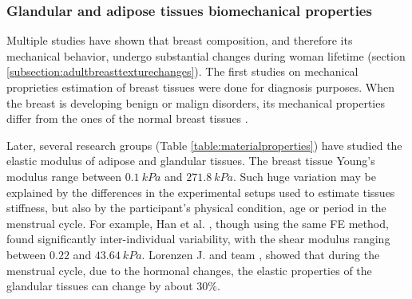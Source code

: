 \subsubsection*{Glandular and adipose tissues biomechanical properties }
 Multiple studies have shown that breast composition, and therefore its mechanical behavior, undergo substantial changes during woman lifetime (section \ref{subsection:adultbreasttexturechanges}). The first studies on mechanical proprieties estimation of breast tissues were done for diagnosis purposes. When the breast is developing benign or malign disorders, its mechanical properties differ from the ones of the normal breast tissues \citep{krouskop_elastic_1998}.  

Later, several research groups (Table \ref{table:materialproperties}) have studied the elastic modulus of adipose and glandular tissues. The breast tissue Young's modulus range between $0.1\ kPa$ and $271.8\ kPa$. Such huge variation may be explained by the differences in the experimental setups used to estimate tissues stiffness, but also by the participant's physical condition, age or period in the menstrual cycle. For example, Han et al. \citep{han_development_2012}, though using the same FE method, found significantly inter-individual variability, with the shear modulus ranging between $0.22$ and $43.64\ kPa$. Lorenzen J. and team \citep{lorenzen_menstrual-cycle_2003}, showed that during the menstrual cycle, due to the hormonal changes, the elastic properties of the glandular tissues can change by about $30\%$.

